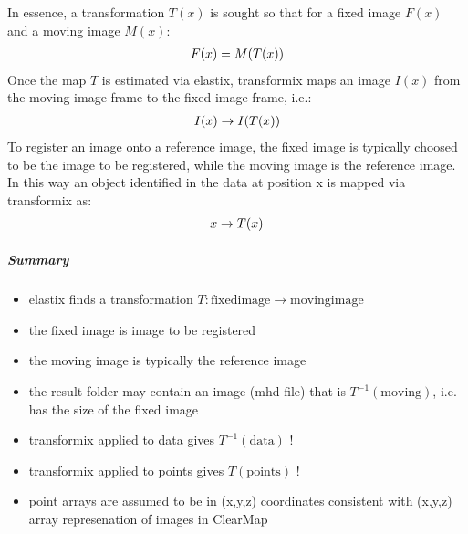 \documentclass[letterpaper,10pt,english]{sphinxmanual}
\begin{document}
In essence, a transformation \(T(x)\) is sought so that for a fixed image
\(F(x)\) and a moving image \(M(x)\):
\begin{gather}
\begin{split}F(x) = M(T(x))\end{split}\notag
\end{gather}
Once the map \(T\) is estimated via elastix, transformix maps an image
\(I(x)\) from the moving image frame to the fixed image frame, i.e.:
\begin{gather}
\begin{split}I(x) \rightarrow I(T(x))\end{split}\notag
\end{gather}
To register an image onto a reference image, the fixed image is typically
choosed to be the image to be registered, while the moving image is the
reference image. In this way an object identified in the data at position x
is mapped via transformix as:
\begin{gather}
\begin{split}x \rightarrow T(x)\end{split}\notag
\end{gather}

\subparagraph{Summary}
\label{api/ClearMap.Alignment:summary}\begin{itemize}
\item {} 
elastix finds a transformation \(T: \mathrm{fixed image} \rightarrow \mathrm{moving image}\)

\item {} 
the fixed image is image to be registered

\item {} 
the moving image is typically the reference image

\item {} 
the result folder may contain an image (mhd file) that is \(T^{-1}(\mathrm{moving})\),
i.e. has the size of the fixed image

\item {} 
transformix applied to data gives \(T^{-1}(\mathrm{data})\) !

\item {} 
transformix applied to points gives \(T(\mathrm{points})\) !

\item {} 
point arrays are assumed to be in (x,y,z) coordinates consistent with (x,y,z) array represenation of images in ClearMap

\end{itemize}
\end{document}
